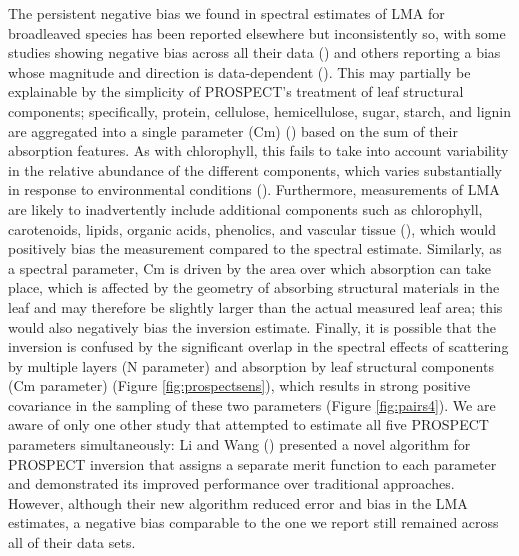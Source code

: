 {The persistent negative bias we found in spectral estimates of LMA for
broadleaved species has been reported elsewhere but inconsistently so, with
some studies showing negative bias across all their data (\cite{Li2011a,
Cheng2014}) and others reporting a bias whose magnitude and direction is
data-dependent (\cite{Feret2008}). This may partially be explainable by the
simplicity of PROSPECT's treatment of leaf structural components;
specifically, protein, cellulose, hemicellulose, sugar, starch, and lignin are
aggregated into a single parameter (Cm) (\cite{Fourty1996}) based on the sum
of their absorption features.  As with chlorophyll, this fails to take into
account variability in the relative abundance of the different components,
which varies substantially in response to environmental conditions
(\cite{Poorter2009}).  Furthermore, measurements of LMA are likely to
inadvertently include additional components such as chlorophyll, carotenoids,
lipids, organic acids, phenolics, and vascular tissue (\cite{Poorter2009}),
which would positively bias the measurement compared to the spectral estimate.
Similarly, as a spectral parameter, Cm is driven by the area over which
absorption can take place, which is affected by the geometry of absorbing
structural materials in the leaf and may therefore be slightly larger than the
actual measured leaf area; this would also negatively bias the inversion
estimate.  Finally, it is possible that the inversion is confused by the
significant overlap in the spectral effects of scattering by multiple layers
(N parameter) and absorption by leaf structural components (Cm parameter)
(Figure \ref{fig:prospectsens}), which results in strong positive covariance
in the sampling of these two parameters (Figure \ref{fig:pairs4}).  We are
aware of only one other study that attempted to estimate all five PROSPECT
parameters simultaneously: Li and Wang (\cite{Li2011a}) presented a novel
algorithm for PROSPECT inversion that assigns a separate merit function to
each parameter and demonstrated its improved performance over traditional
approaches.  However, although their new algorithm reduced error and bias in
the LMA estimates, a negative bias comparable to the one we report still
remained across all of their data sets. 

}
